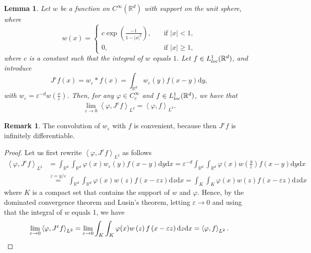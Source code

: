 \documentclass[11pt,a4paper,reqno]{amsart}
\numberwithin{equation}{section}
\theoremstyle{plain}
\newtheorem{lemma}[theorem]{Lemma}
\theoremstyle{definition}
\newtheorem{remark}[theorem]{Remark}
\def\e{{\varepsilon}}
\def\ud{\mathrm d}
\newcommand{\ip}[1]{\left\langle#1\right\rangle}
\newcommand{\R}{\mathbb{R}}
\newcommand{\abs}[1]{\left|#1\right|} %
\begin{document}
\begin{lemma}
\label{lem:2}
Let $w$ be a function on $C^\infty (\R^d)$ with support on the unit sphere, where
\[
w (x) = \left\{ 
\begin{aligned}
c\exp \left( \frac{-1}{1 - \abs{x}^2} \right), \quad & \text{if $\abs{x} < 1$}, \\ 
0, \quad & \text{if $\abs{x} \ge 1$,}
\end{aligned}
\right.
\]
where $c$ is a constant such that the integral of $w$ equals $1$. 
Let $f \in L^1_{\emph{loc}} (\R^d)$, and introduce
\[
J^\e f (x) = w_\e*f (x) = \int_{\R^d} w_\e \left( y \right) f \left( x - y \right) \ud y, 
\]
with $w_\e = \e^{-d}w \left( \frac{x}{\e} \right)$.
Then, for any $\varphi \in C^\infty_c$ and $f \in L^1_{\emph{loc}} (\R^d)$, we have that
\begin{align*}
 \lim_{\e \to 0}\ip{\varphi, J^\e f}_{L^2} = \ip{\varphi, f}_{L^2}.
\end{align*}
\end{lemma}

\begin{remark}
The convolution of $w_\e$ with $f$ is convenient, because then $J^\e f$ is infinitely differentiable. 
\end{remark}

\begin{proof}
Let us first rewrite $\ip{\varphi, J^\e f}_{L^2}$ as follows
\begin{align*}
\ip{\varphi, J^\e f}_{L^2} 
    &= \int_{\R^d} \int_{\R^d} \varphi (x) w_\e \left( y \right) f \left( x - y \right) \ud y \ud x
    = \e^{-d} \int_{\R^d} \int_{\R^d} \varphi (x) w \left( \frac{y}{\e} \right) f \left( x - y \right) \ud y \ud x \\ 
    &\stackrel{z = y/\e }{=} \int_{\R^d} \int_{\R^d} \varphi (x) w \left( z \right) f \left( x - \e z \right) \ud z \ud x = \int_K \int_K \varphi (x) w \left( z \right) f \left( x - \e z \right) \ud z \ud x
\end{align*}
where $K$ is a compact set that contains the support of $w$ and $\varphi$. 
Hence, by the dominated convergence theorem and Lusin's theorem, letting $\e \to 0$ and using that the integral of $w$ equals 1, we have
\[
 \lim_{\e \to 0}\ip{\varphi, J^\e f}_{L^2} = \lim_{\e \to 0} \int_K \int_K \varphi (x) w \left( z \right) f \left( x - \e z \right) \ud z \ud x = \ip{\varphi, f}_{L^2}. \qedhere
\]
\end{proof}
\end{document}
